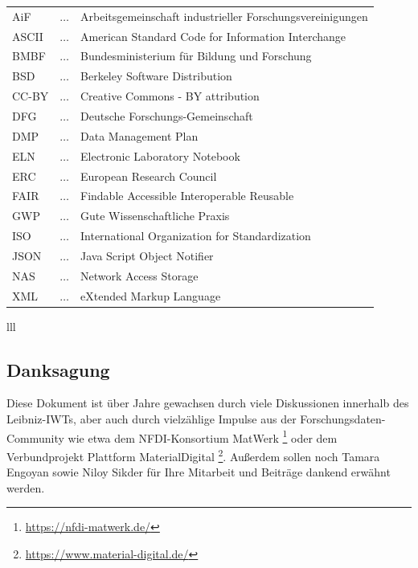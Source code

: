 \begin{table}[h]
\begin{tabular}{lll}
AiF   & $\ldots$  & Arbeits­gemeinschaft industrieller Forschungs­vereinigungen \\
ASCII & $\ldots$  & American Standard Code for Information Interchange \\
BMBF  & $\ldots$  & Bundesministerium für Bildung und Forschung \\
BSD   & $\ldots$  & Berkeley Software Distribution \\
CC-BY & $\ldots$  & Creative Commons - BY attribution \\
DFG   & $\ldots$  & Deutsche Forschungs-Gemeinschaft \\
DMP   & $\ldots$  & Data Management Plan \\
ELN   & $\ldots$  & Electronic Laboratory Notebook \\
ERC   & $\ldots$  & European Research Council \\
FAIR  & $\ldots$  & Findable Accessible Interoperable Reusable \\
GWP   & $\ldots$  & Gute Wissenschaftliche Praxis \\
ISO   & $\ldots$  & International Organization for Standardization  \\
JSON  & $\ldots$  & Java Script Object Notifier \\
NAS   & $\ldots$  & Network Access Storage \\
XML   & $\ldots$  & eXtended Markup Language \\

\end{tabular} {lll}
\end{table}





\subsection*{Danksagung}
Diese Dokument ist über Jahre gewachsen durch viele Diskussionen innerhalb des Leibniz-IWTs, aber auch durch vielzählige Impulse aus der Forschungsdaten-Community wie etwa dem NFDI-Konsortium MatWerk \footnote{\url{https://nfdi-matwerk.de/}} oder dem Verbundprojekt Plattform MaterialDigital \footnote{\url{https://www.material-digital.de/}}. Außerdem sollen noch Tamara Engoyan sowie Niloy Sikder für Ihre Mitarbeit und Beiträge dankend erwähnt werden.


